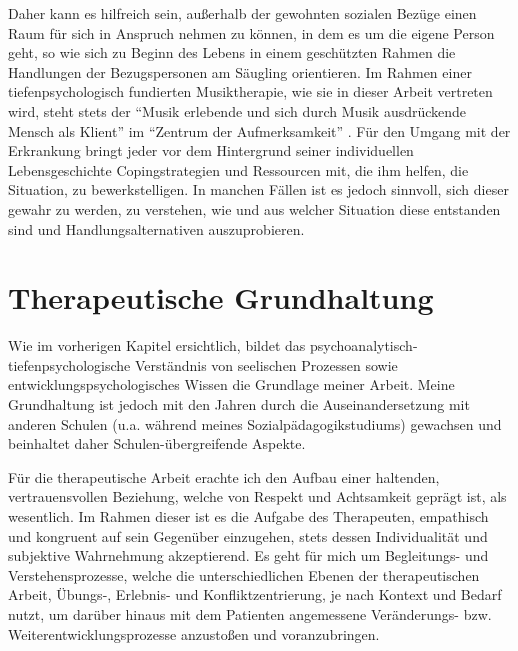 Daher kann es hilfreich sein, außerhalb der gewohnten sozialen Bezüge einen Raum für sich in Anspruch nehmen zu können, in dem es um die eigene Person geht, so wie sich zu Beginn des Lebens in einem geschützten Rahmen die Handlungen der Bezugspersonen am Säugling orientieren. Im Rahmen einer tiefenpsychologisch fundierten Musiktherapie, wie sie in dieser Arbeit vertreten wird, steht stets der "`Musik erlebende und sich durch Musik ausdrückende Mensch als Klient"' im "`Zentrum der Aufmerksamkeit"' \autocite[4]{timmermann2004}. Für den Umgang mit der Erkrankung bringt jeder vor dem Hintergrund seiner individuellen Lebensgeschichte Copingstrategien und Ressourcen mit, die ihm helfen, die Situation, zu bewerkstelligen. In manchen Fällen ist es jedoch sinnvoll, sich dieser gewahr zu werden, zu verstehen, wie und aus welcher Situation diese entstanden sind und Handlungsalternativen auszuprobieren. 

\section{Therapeutische Grundhaltung} 
Wie im vorherigen Kapitel ersichtlich, bildet das psychoanalytisch-tiefenpsychologische Verständnis von seelischen Prozessen sowie entwicklungspsychologisches Wissen die Grundlage meiner Arbeit. Meine Grundhaltung ist jedoch mit den Jahren durch die Auseinandersetzung mit anderen Schulen (u.a. während meines Sozialpädagogikstudiums) gewachsen und beinhaltet daher Schulen-übergreifende Aspekte. 

Für die therapeutische Arbeit erachte ich den Aufbau einer haltenden, vertrauensvollen Beziehung, welche von Respekt und Achtsamkeit geprägt ist, als wesentlich. 
Im Rahmen dieser ist es die Aufgabe des Therapeuten, empathisch und kongruent auf sein Gegenüber einzugehen, stets dessen Individualität und subjektive Wahrnehmung akzeptierend. 
Es geht für mich um Begleitungs- und Verstehensprozesse, welche die unterschiedlichen Ebenen der therapeutischen Arbeit, Übungs-, Erlebnis- und Konfliktzentrierung, je nach Kontext und Bedarf nutzt, um darüber hinaus mit dem Patienten angemessene Veränderungs- bzw. Weiterentwicklungsprozesse anzustoßen und voranzubringen. 

